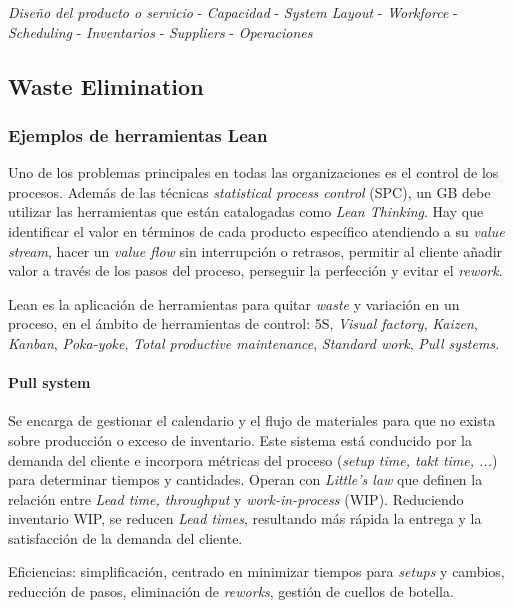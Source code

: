 \documentclass[]{article}
\begin{document}
\begin{center}
\textit{Diseño del producto o servicio} - \textit{Capacidad} - \textit{System Layout} - \textit{Workforce} - \textit{Scheduling} - \textit{Inventarios} - \textit{Suppliers} - \textit{Operaciones}
\end{center}
\subsection{Waste Elimination}
\subsubsection{Ejemplos de herramientas Lean}
Uno de los problemas principales en todas las organizaciones es el control de los procesos. Además de las técnicas \textit{statistical process control} (SPC), un GB debe utilizar las herramientas que están catalogadas como \textit{Lean Thinking}. Hay que identificar el valor en términos de cada producto específico atendiendo a su \textit{value stream}, hacer un \textit{value flow} sin interrupción o retrasos, permitir al cliente añadir valor a través de los pasos del proceso, perseguir la perfección y evitar el \textit{rework}.

Lean es la aplicación de herramientas para quitar \textit{waste} y variación en un proceso, en el ámbito de herramientas de control: 5S, \textit{Visual factory}, \textit{Kaizen}, \textit{Kanban}, \textit{Poka-yoke}, \textit{Total productive maintenance}, \textit{Standard work}, \textit{Pull systems}.

\paragraph{Pull system}

Se encarga de gestionar el calendario y el flujo de materiales para que no exista sobre producción o exceso de inventario. Este sistema está conducido por la demanda del cliente e incorpora métricas del proceso (\textit{setup time, takt time, ...}) para determinar tiempos y cantidades. Operan con \textit{Little's law} que definen la relación entre \textit{Lead time, throughput} y \textit{work-in-process} (WIP). Reduciendo inventario WIP, se reducen \textit{Lead times}, resultando más rápida la entrega y la satisfacción de la demanda del cliente.

Eficiencias: simplificación, centrado en minimizar tiempos para \textit{setups} y cambios, reducción de pasos, eliminación de \textit{reworks}, gestión de cuellos de botella.
\end{document}
